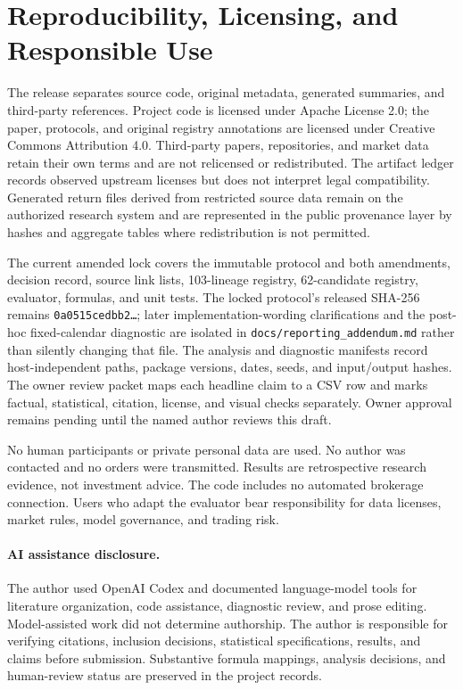 \documentclass[11pt]{article}
\begin{document}
\section{Reproducibility, Licensing, and Responsible Use}\label{sec:reproducibility}

The release separates source code, original metadata, generated summaries, and third-party references. Project code is licensed under Apache License 2.0; the paper, protocols, and original registry annotations are licensed under Creative Commons Attribution 4.0. Third-party papers, repositories, and market data retain their own terms and are not relicensed or redistributed. The artifact ledger records observed upstream licenses but does not interpret legal compatibility. Generated return files derived from restricted source data remain on the authorized research system and are represented in the public provenance layer by hashes and aggregate tables where redistribution is not permitted.

The current amended lock covers the immutable protocol and both amendments, decision record, source link lists, 103-lineage registry, 62-candidate registry, evaluator, formulas, and unit tests. The locked protocol's released SHA-256 remains \texttt{0a0515cedbb2\ldots}; later implementation-wording clarifications and the post-hoc fixed-calendar diagnostic are isolated in \texttt{docs/reporting\_addendum.md} rather than silently changing that file. The analysis and diagnostic manifests record host-independent paths, package versions, dates, seeds, and input/output hashes. The owner review packet maps each headline claim to a CSV row and marks factual, statistical, citation, license, and visual checks separately. Owner approval remains pending until the named author reviews this draft.

No human participants or private personal data are used. No author was contacted and no orders were transmitted. Results are retrospective research evidence, not investment advice. The code includes no automated brokerage connection. Users who adapt the evaluator bear responsibility for data licenses, market rules, model governance, and trading risk.

\paragraph{AI assistance disclosure.} The author used OpenAI Codex and documented language-model tools for literature organization, code assistance, diagnostic review, and prose editing. Model-assisted work did not determine authorship. The author is responsible for verifying citations, inclusion decisions, statistical specifications, results, and claims before submission. Substantive formula mappings, analysis decisions, and human-review status are preserved in the project records.
\end{document}
